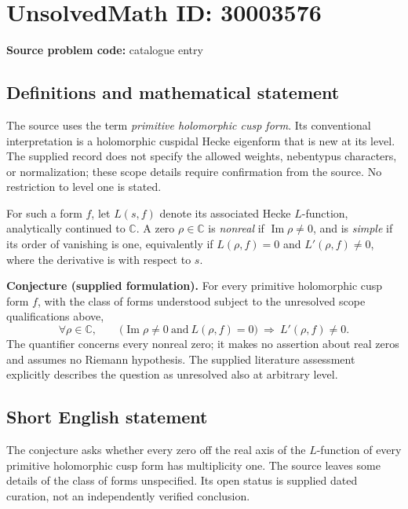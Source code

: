 \documentclass[11pt]{article}
\newcommand{\C}{\mathbb{C}}
\begin{document}
\section*{UnsolvedMath ID: 30003576}
\textbf{Source problem code:} catalogue entry
\subsection{Definitions and mathematical statement}
The source uses the term \emph{primitive holomorphic cusp form}. Its conventional interpretation is a holomorphic cuspidal Hecke eigenform that is new at its level. The supplied record does not specify the allowed weights, nebentypus characters, or normalization; these scope details require confirmation from the source. No restriction to level one is stated.

For such a form \(f\), let \(L(s,f)\) denote its associated Hecke \(L\)-function, analytically continued to \(\C\). A zero \(\rho\in\C\) is \emph{nonreal} if \(\operatorname{Im}\rho\ne0\), and is \emph{simple} if its order of vanishing is one, equivalently if \(L(\rho,f)=0\) and \(L'(\rho,f)\ne0\), where the derivative is with respect to \(s\).

\textbf{Conjecture (supplied formulation).} For every primitive holomorphic cusp form \(f\), with the class of forms understood subject to the unresolved scope qualifications above,
\[
\forall\rho\in\C,\qquad
\bigl(\operatorname{Im}\rho\ne0\ \text{and}\ L(\rho,f)=0\bigr)
\ \Longrightarrow\ L'(\rho,f)\ne0.
\]
The quantifier concerns every nonreal zero; it makes no assertion about real zeros and assumes no Riemann hypothesis. The supplied literature assessment explicitly describes the question as unresolved also at arbitrary level.
\subsection{Short English statement}
The conjecture asks whether every zero off the real axis of the \(L\)-function of every primitive holomorphic cusp form has multiplicity one. The source leaves some details of the class of forms unspecified. Its open status is supplied dated curation, not an independently verified conclusion.
\end{document}
